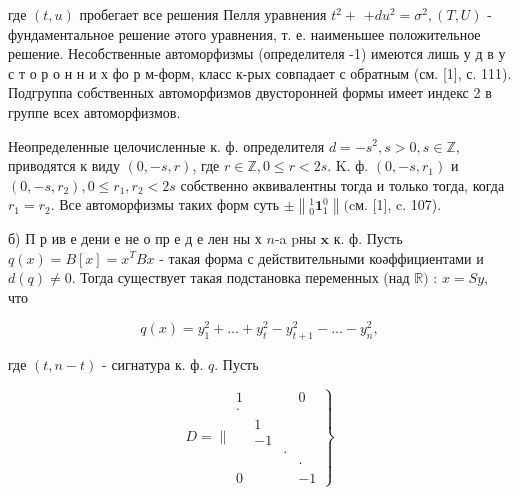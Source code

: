 \documentclass[10pt]{article}
\begin{document}
где $(t, u)$ пробегает все решения Пелля уравнения $t^{2}+$ $+d u^{2}=\sigma^{2},(T, U)$ - фундаментальное решение әтого уравнения, т. е. наименьшее положительное решение. Несобственные автоморфизмы (определителя -1) имеются лишь у д в у с т о р о н н и х фо р м-форм, класс к-рых совпадает с обратным (см. [1], с. 111). Подгруппа собственных автоморфизмов двусторонней формы имеет индекс 2 в группе всех автоморфизмов.



Неопределенные целочисленные к. ф. определителя $d=-s^{2}, s>0, s \in \mathbb{Z}$, приводятся к виду $(0,-s, r)$, где $r \in \mathbb{Z}, 0 \leqslant r<2 s$. K. ф. $\left(0,-s, r_{1}\right)$ и $\left(0,-s, r_{2}\right), 0 \leqslant r_{1}, r_{2}<2 s$ собственно әквивалентны тогда и только тогда, когда $r_{1}=r_{2}$. Все автоморфизмы таких форм суть $\pm\left\|_{0}^{1} \mathbf{1}_{1}^{0}\right\|(\mathrm{cм}$. [1], c. 107).



б) П р ив е дени е не о пр е д е лен ны х $n$-a pны $\mathbf{x}$ к. ф. Пусть $q(x)=B[x]=x^{T} B x$ - такая форма с действительными коәффициентами и $d(q) \neq 0$. Тогда существует такая подстановка переменных (над $\mathbb{R})$ : $x=S y, \quad$ что



\[

q(x)=y_{1}^{2}+\ldots+y_{t}^{2}-y_{t+1}^{2}-\ldots-y_{n}^{2},

\]



где $(t, n-t)$ - сигнатура к. ф. $q$. Пусть



\[

\left.D=\| \begin{array}{llll}

1 & & & 0 \\

\cdot & & & \\

& 1 & & \\

& -1 & \\

& & \cdot & \\

& & & \cdot \\

0 & & & -1

\end{array}\right\}

\]
\end{document}
